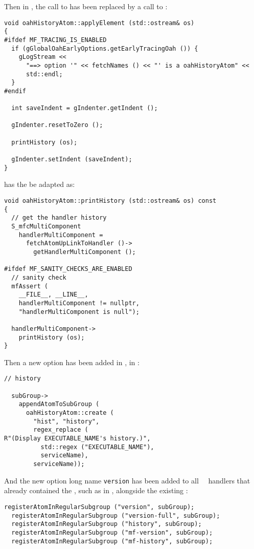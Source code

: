 Then in , the call to  has been replaced by a call to :
\begin{lstlisting}[language=CPlusPlus]
void oahHistoryAtom::applyElement (std::ostream& os)
{
#ifdef MF_TRACING_IS_ENABLED
  if (gGlobalOahEarlyOptions.getEarlyTracingOah ()) {
    gLogStream <<
      "==> option '" << fetchNames () << "' is a oahHistoryAtom" <<
      std::endl;
  }
#endif

  int saveIndent = gIndenter.getIndent ();

  gIndenter.resetToZero ();

  printHistory (os);

  gIndenter.setIndent (saveIndent);
}
\end{lstlisting}

\method{}{} has the be adapted as:
\begin{lstlisting}[language=CPlusPlus]
void oahHistoryAtom::printHistory (std::ostream& os) const
{
  // get the handler history
  S_mfcMultiComponent
    handlerMultiComponent =
      fetchAtomUpLinkToHandler ()->
        getHandlerMultiComponent ();

#ifdef MF_SANITY_CHECKS_ARE_ENABLED
  // sanity check
  mfAssert (
    __FILE__, __LINE__,
    handlerMultiComponent != nullptr,
    "handlerMultiComponent is null");

  handlerMultiComponent->
    printHistory (os);
}
\end{lstlisting}

Then a new option has been added in , in :
\begin{lstlisting}[language=CPlusPlus]
  // history

  subGroup->
    appendAtomToSubGroup (
      oahHistoryAtom::create (
        "hist", "history",
        regex_replace (
R"(Display EXECUTABLE_NAME's history.)",
          std::regex ("EXECUTABLE_NAME"),
          serviceName),
        serviceName));
\end{lstlisting}

And the new option long name {\tt version} has been added to all \regular\ \oahRepr\ handlers that already contained the , such as in , alongside the existing :
\begin{lstlisting}[language=CPlusPlus]
  registerAtomInRegularSubgroup ("version", subGroup);
  registerAtomInRegularSubgroup ("version-full", subGroup);
  registerAtomInRegularSubgroup ("history", subGroup);
  registerAtomInRegularSubgroup ("mf-version", subGroup);
  registerAtomInRegularSubgroup ("mf-history", subGroup);
\end{lstlisting}


